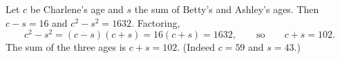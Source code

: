 Let $c$ be Charlene's age and $s$ the sum of Betty's and Ashley's ages. Then $c-s=16$ and $c^2-s^2=1632$. Factoring,
\[
c^2-s^2=(c-s)(c+s)=16(c+s)=1632,\qquad\text{so}\qquad c+s=102 .
\]
The sum of the three ages is $c+s=\boxed{102}$. (Indeed $c=59$ and $s=43$.)
